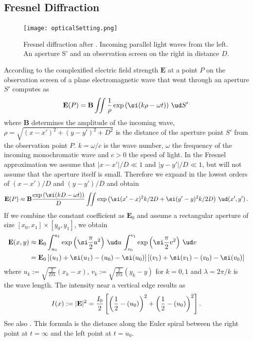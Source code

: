 \documentclass[12pt]{article}
\newcommand\defbf[2]{\def#1{{\mathbf{#2}}}}
\let\C=\relax
\DeclareMathOperator\C{C} %
\def\d#1{{\,\ud#1\,}}
\let\S=\relax
\DeclareMathOperator\S{S} %
\begin{document}
\subsection{Fresnel Diffraction}
\defbf\E{E}
\defbf\B{B}
\begin{figure}[h!]
	\centering
	\texttt{[image: opticalSetting.png]} \\
	\label{f:FresnelDiffraction}
	\caption{Fresnel diffraction after \cite[ch.~8.1]{Zim08}. Incoming parallel light waves from the left.  An aperture S' and an observation screen on the right in distance $D$.}
\end{figure}
According to \cite[ch.~7]{Zim08} the complexified electric field strength $\E$ at a point $P$ on the observation screen of a plane electromagnetic wave that went through an aperture $S'$ computes as
\[  \E(P) = \B\iint  \frac1\rho \exp\left(\si(k\rho-\omega t)\right) \d{S'}
\] where $\B$ determines the amplitude of the incoming wave,\\ $\rho=\sqrt{(x-x')^2+(y-y')^2+D^2}$ is the distance of the aperture point $S'$ from the observation point $P$.  $k=\omega/c$ is the wave number, $\omega$ the frequency of the incoming monochromatic wave and $c>0$ the speed of light.  In the Fresnel approximation we assume that $|x-x'|/D\ll 1$ and $|y-y'|/D\ll 1$, but will not assume that the aperture itself is small.  Therefore we expand in the lowest orders of $(x-x')/D$ and $(y-y')/D$ and obtain
\[  \E(P) \approx \B\frac{\exp\left(\si(kD-\omega t)\right)}{D} \iint \exp\left(\si(x'-x)^2k/2D +\si(y'-y)^2k/2D\right) \d{(x',y')}.
\]  If we combine the constant coefficient as $\E_0$ and assume a rectangular aperture of size $[x_0,x_1]\times[y_0,y_1]$, we obtain
\begin{align*}  \E(x,y) &\approx \E_0 \int_{u_0}^{u_1} \exp\left(\si\frac\pi2 u^2\right)\d{u} \int_{v_0}^{v_1} \exp\left(\si\frac\pi2 v^2\right) \d{v} \\
  &= \E_0 \left[\C(u_1)+\si\S(u_1)-\C(u_0)-\si\S(u_0)\right] \left[\C(v_1)+\si\S(v_1)-\C(v_0)-\si\S(v_0)\right]
\end{align*} where $u_k:=\sqrt{\frac2{D\lambda}}(x_k-x)$, $v_k:= \sqrt{\frac2{D\lambda}}(y_k-y)$ for $k=0,1$ \cite[Eqns.~(8.34a\&b)]{Zim08} and $\lambda=2\pi/k$ is the wave length.  The intensity near a vertical edge results as
\[  I(x):= |\E|^2 = \frac{I_0}{2} \left[\left(\frac12-\C(u_0)\right)^2+\left(\frac12-\S(u_0)\right)^2\right].
\] See also \cite[Eqn.~(8.38)]{Zim08}.  This formula is the distance along the Euler spiral between the right point at $t=\infty$ and the left point at $t=u_0$.
\end{document}
